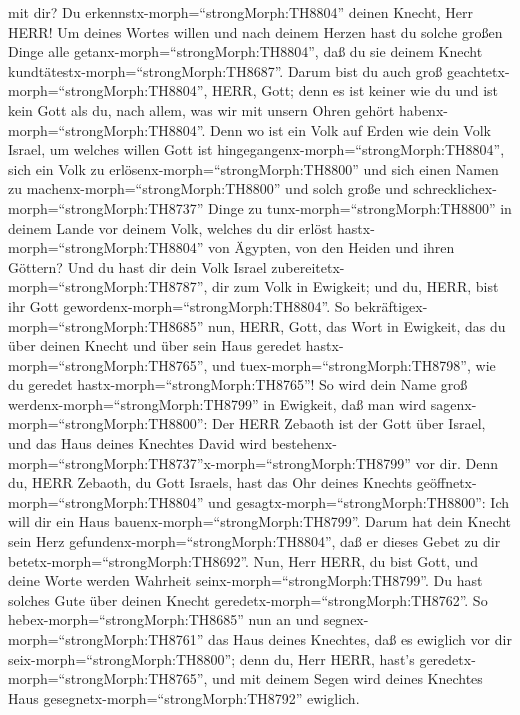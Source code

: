 mit dir? Du erkennstx-morph=``strongMorph:TH8804'' deinen Knecht, Herr
HERR!  Um deines Wortes willen und nach deinem Herzen hast
du solche großen Dinge alle getanx-morph=``strongMorph:TH8804'', daß du
sie deinem Knecht kundtätestx-morph=``strongMorph:TH8687''.
 Darum bist du auch groß
geachtetx-morph=``strongMorph:TH8804'', HERR, Gott; denn es ist keiner
wie du und ist kein Gott als du, nach allem, was wir mit unsern Ohren
gehört habenx-morph=``strongMorph:TH8804''.  Denn wo ist
ein Volk auf Erden wie dein Volk Israel, um welches willen Gott ist
hingegangenx-morph=``strongMorph:TH8804'', sich ein Volk zu
erlösenx-morph=``strongMorph:TH8800'' und sich einen Namen zu
machenx-morph=``strongMorph:TH8800'' und solch große und
schrecklichex-morph=``strongMorph:TH8737'' Dinge zu
tunx-morph=``strongMorph:TH8800'' in deinem Lande vor deinem Volk,
welches du dir erlöst hastx-morph=``strongMorph:TH8804'' von Ägypten,
von den Heiden und ihren Göttern?  Und du hast dir dein
Volk Israel zubereitetx-morph=``strongMorph:TH8787'', dir zum Volk in
Ewigkeit; und du, HERR, bist ihr Gott
gewordenx-morph=``strongMorph:TH8804''.  So
bekräftigex-morph=``strongMorph:TH8685'' nun, HERR, Gott, das Wort in
Ewigkeit, das du über deinen Knecht und über sein Haus geredet
hastx-morph=``strongMorph:TH8765'', und
tuex-morph=``strongMorph:TH8798'', wie du geredet
hastx-morph=``strongMorph:TH8765''!  So wird dein Name groß
werdenx-morph=``strongMorph:TH8799'' in Ewigkeit, daß man wird
sagenx-morph=``strongMorph:TH8800'': Der HERR Zebaoth ist der Gott über
Israel, und das Haus deines Knechtes David wird
bestehenx-morph=``strongMorph:TH8737''x-morph=``strongMorph:TH8799'' vor
dir.  Denn du, HERR Zebaoth, du Gott Israels, hast das Ohr
deines Knechts geöffnetx-morph=``strongMorph:TH8804'' und
gesagtx-morph=``strongMorph:TH8800'': Ich will dir ein Haus
bauenx-morph=``strongMorph:TH8799''. Darum hat dein Knecht sein Herz
gefundenx-morph=``strongMorph:TH8804'', daß er dieses Gebet zu dir
betetx-morph=``strongMorph:TH8692''.  Nun, Herr HERR, du
bist Gott, und deine Worte werden Wahrheit
seinx-morph=``strongMorph:TH8799''. Du hast solches Gute über deinen
Knecht geredetx-morph=``strongMorph:TH8762''.  So
hebex-morph=``strongMorph:TH8685'' nun an und
segnex-morph=``strongMorph:TH8761'' das Haus deines Knechtes, daß es
ewiglich vor dir seix-morph=``strongMorph:TH8800''; denn du, Herr HERR,
hast's geredetx-morph=``strongMorph:TH8765'', und mit deinem Segen wird
deines Knechtes Haus gesegnetx-morph=``strongMorph:TH8792'' ewiglich.

